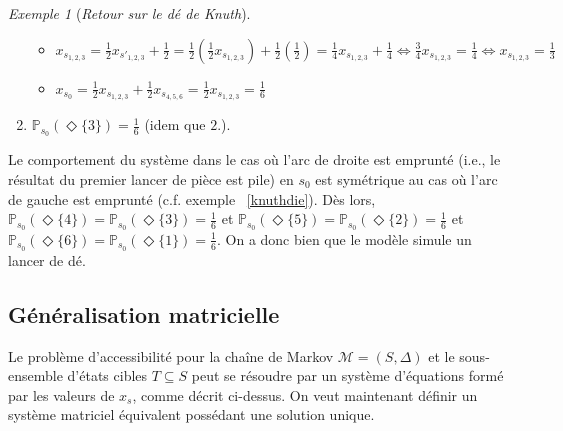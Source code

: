 \documentclass[12pt,a4paper]{report}
\theoremstyle{definition}%
\theoremstyle{remark}
\newtheorem{example}{Exemple}[chapter]
\newcommand{\ie}{i.e., }
\newcommand{\cf}{c.f. }
\begin{document}
\begin{example}[\textit{Retour sur le dé de Knuth}]
\begin{spacing}{1.5}
\begin{enumerate}
\begin{itemize}
			\item $x_{s_{1, 2, 3}} = \frac{1}{2} x_{s'_{1, 2, 3}} + \frac{1}{2}  =
			\frac{1}{2} (\frac{1}{2} x_{s_{1, 2, 3}}) +\frac{1}{2} (\frac{1}{2})
			= \frac{1}{4} x_{s_{1, 2, 3}} +\frac{1}{4}
			\Leftrightarrow \frac{3}{4} x_{s_{1, 2, 3}} = \frac{1}{4}
			\Leftrightarrow x_{s_{1, 2, 3}} = \frac{1}{3}$
			\item $x_{s_0} = \frac{1}{2} x_{s_{1,2,3}} + \frac{1}{2} x_{s_{4, 5, 6}} = \frac{1}{2} x_{s_{1,2,3}} = \frac{1}{6}$
		\end{itemize}
		\item $\mathbb{P}_{s_0} (\Diamond \{3\}) = \frac{1}{6}$ (idem que $2.$).
	\end{enumerate}\end{spacing}
	Le comportement du système dans le cas où l'arc de droite est emprunté (\ie le résultat du premier lancer de pièce est pile) en $s_0$ est symétrique au cas où l'arc de gauche est emprunté (\cf exemple  ~\ref{knuthdie}). Dès lors, $\mathbb{P}_{s_0}(\Diamond \{4\}) = \mathbb{P}_{s_0}(\Diamond \{3\}) = \frac{1}{6}$ et $\mathbb{P}_{s_0}(\Diamond \{5\}) = \mathbb{P}_{s_0}(\Diamond \{2\}) = \frac{1}{6}$ et $\mathbb{P}_{s_0}(\Diamond \{6\}) = \mathbb{P}_{s_0}(\Diamond \{1\}) = \frac{1}{6}$. On a donc bien que le modèle simule un lancer de dé.

\end{example}

\subsection{Généralisation matricielle}
Le problème d'accessibilité pour la chaîne de Markov $\mathcal{M} = (S, \Delta)$ et le sous-ensemble d'états cibles $T \subseteq S$ peut se résoudre par un système d'équations formé par les valeurs de $x_s$, comme décrit ci-dessus. On veut maintenant définir un système matriciel équivalent possédant une solution unique.\\
\end{document}

